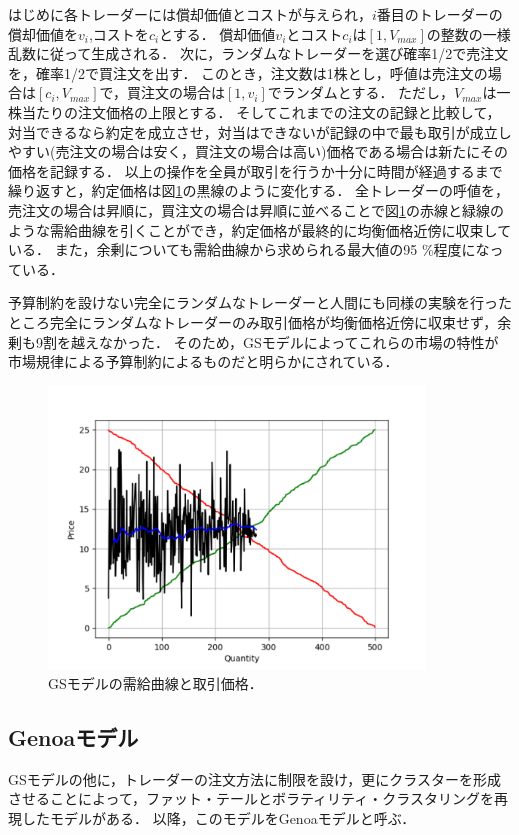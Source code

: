 \documentclass[titlepage]{jsreport}
\begin{document}
はじめに各トレーダーには償却価値とコストが与えられ，$i$番目のトレーダーの償却価値を$v_i$,コストを$c_i$とする．
償却価値$v_i$とコスト$c_i$は$[1, V_{max}]$の整数の一様乱数に従って生成される．
次に，ランダムなトレーダーを選び確率1/2で売注文を，確率1/2で買注文を出す．
このとき，注文数は1株とし，呼値は売注文の場合は$[c_i, V_{max}]$で，買注文の場合は$[1, v_i]$でランダムとする．
ただし，$V_{max}$は一株当たりの注文価格の上限とする．
そしてこれまでの注文の記録と比較して，対当できるなら約定を成立させ，対当はできないが記録の中で最も取引が成立しやすい(売注文の場合は安く，買注文の場合は高い)価格である場合は新たにその価格を記録する．
以上の操作を全員が取引を行うか十分に時間が経過するまで繰り返すと，約定価格は図\ref{fig:gode_sunder_trade}の黒線のように変化する．
全トレーダーの呼値を，売注文の場合は昇順に，買注文の場合は昇順に並べることで図\ref{fig:gode_sunder_trade}の赤線と緑線のような需給曲線を引くことができ，約定価格が最終的に均衡価格近傍に収束している．
また，余剰についても需給曲線から求められる最大値の95 \%程度になっている．

予算制約を設けない完全にランダムなトレーダーと人間にも同様の実験を行ったところ完全にランダムなトレーダーのみ取引価格が均衡価格近傍に収束せず，余剰も9割を越えなかった．
そのため，GSモデルによってこれらの市場の特性が市場規律による予算制約によるものだと明らかにされている．
\begin{figure}[htbp]
    \centering
    \includegraphics[width=10cm]{fig/gode_sunder_trade.pdf}
    \caption{GSモデルの需給曲線と取引価格．}
    \label{fig:gode_sunder_trade}
\end{figure}


\subsection{Genoaモデル}
GSモデルの他に，トレーダーの注文方法に制限を設け，更にクラスターを形成させることによって，ファット・テールとボラティリティ・クラスタリングを再現したモデルがある\cite{Genoa}．
以降，このモデルをGenoaモデルと呼ぶ．
\end{document}
